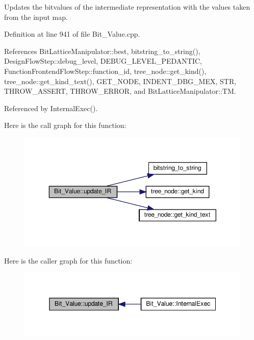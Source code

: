 Updates the bitvalues of the intermediate representation with the values taken from the input map. 



Definition at line 941 of file Bit\+\_\+\+Value.\+cpp.



References Bit\+Lattice\+Manipulator\+::best, bitstring\+\_\+to\+\_\+string(), Design\+Flow\+Step\+::debug\+\_\+level, D\+E\+B\+U\+G\+\_\+\+L\+E\+V\+E\+L\+\_\+\+P\+E\+D\+A\+N\+T\+IC, Function\+Frontend\+Flow\+Step\+::function\+\_\+id, tree\+\_\+node\+::get\+\_\+kind(), tree\+\_\+node\+::get\+\_\+kind\+\_\+text(), G\+E\+T\+\_\+\+N\+O\+DE, I\+N\+D\+E\+N\+T\+\_\+\+D\+B\+G\+\_\+\+M\+EX, S\+TR, T\+H\+R\+O\+W\+\_\+\+A\+S\+S\+E\+RT, T\+H\+R\+O\+W\+\_\+\+E\+R\+R\+OR, and Bit\+Lattice\+Manipulator\+::\+TM.



Referenced by Internal\+Exec().

Here is the call graph for this function\+:
\nopagebreak
\begin{figure}[H]
\begin{center}
\leavevmode
\includegraphics[width=350pt]{df/d4b/classBit__Value_a2c7439f99c654aefc5ebf88e517fa6e6_cgraph}
\end{center}
\end{figure}
Here is the caller graph for this function\+:
\nopagebreak
\begin{figure}[H]
\begin{center}
\leavevmode
\includegraphics[width=345pt]{df/d4b/classBit__Value_a2c7439f99c654aefc5ebf88e517fa6e6_icgraph}
\end{center}
\end{figure}


